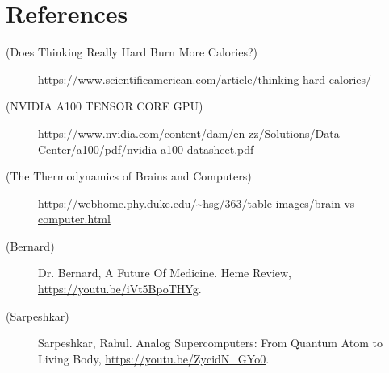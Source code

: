 \newpage
\section*{References}

\newcommand{\source}[2]{
\item [({#1})]{#2}
}

\begin{description}
\source{Does Thinking Really Hard Burn More Calories?}{\url{https://www.scientificamerican.com/article/thinking-hard-calories/}}
\source{NVIDIA A100
TENSOR CORE GPU}{\url{https://www.nvidia.com/content/dam/en-zz/Solutions/Data-Center/a100/pdf/nvidia-a100-datasheet.pdf}}
\source{The Thermodynamics of Brains and Computers}{\url{https://webhome.phy.duke.edu/~hsg/363/table-images/brain-vs-computer.html}}
\source{Bernard}{Dr. Bernard, A Future Of Medicine. Heme Review, \url{https://youtu.be/iVt5BpoTHYg}.}
\source{Sarpeshkar}{Sarpeshkar, Rahul. Analog Supercomputers: From Quantum Atom to Living Body, \url{https://youtu.be/ZycidN_GYo0}.}
\end{description}


